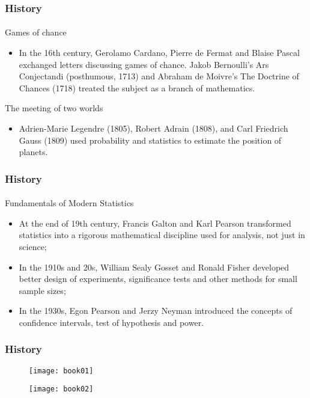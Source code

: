 \documentclass[10pt]{beamer}
\begin{document}
\begin{frame}
\frametitle{History}
\framesubtitle{}
\begin{block}{Games of chance}
\begin{itemize}
\item<1-> In the 16th century, Gerolamo Cardano, Pierre de Fermat and Blaise Pascal exchanged letters discussing games of chance.  Jakob Bernoulli's Ars Conjectandi (posthumous, 1713) and Abraham de Moivre's The Doctrine of Chances (1718) treated the subject as a branch of mathematics. 
\end{itemize}
\end{block}
\begin{block}{The meeting of two worlds}
\begin{itemize}
\item<1-> Adrien-Marie Legendre (1805), Robert Adrain (1808), and Carl Friedrich Gauss (1809) used probability and statistics to estimate the position of planets. 
\end{itemize}
\end{block}
\end{frame}

\begin{frame}
\frametitle{History}
\framesubtitle{}
\begin{block}{Fundamentals of Modern Statistics}
\begin{itemize}
\item<1-> At the end of 19th century, Francis Galton and Karl Pearson transformed statistics into a rigorous mathematical discipline used for analysis, not just in science;
\item<2-> In the 1910s and 20s, William Sealy Gosset and Ronald Fisher developed better design of experiments, significance tests and other methods for small sample sizes;
\item<3-> In the 1930s, Egon Pearson and Jerzy Neyman introduced the concepts of confidence intervals, test of hypothesis and power.
\end{itemize}
\end{block}
\end{frame}

\begin{frame}
\frametitle{History}
\begin{figure}[!htb]
    \centering
    \begin{minipage}{.5\textwidth}
        \centering
        \texttt{[image: book01]}
        \label{fig:prob1_6_2}
    \end{minipage}%
    \begin{minipage}{0.5\textwidth}
        \centering
        \texttt{[image: book02]}
        \label{fig:prob1_6_1}
    \end{minipage}
\end{figure}
\end{frame}
\end{document}
